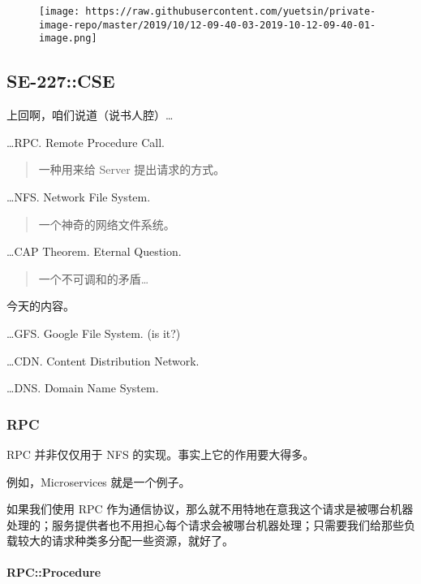 \documentclass[
]{article}
\begin{document}
\begin{figure}
\centering
\texttt{[image: https://raw.githubusercontent.com/yuetsin/private-image-repo/master/2019/10/12-09-40-03-2019-10-12-09-40-01-image.png]}
\caption{}
\end{figure}

\hypertarget{header-n125}{%
\subsection{SE-227::CSE}\label{header-n125}}

上回啊，咱们说道（说书人腔）\ldots{}

\ldots RPC. Remote Procedure Call.

\begin{quote}
一种用来给 Server 提出请求的方式。
\end{quote}

\ldots NFS. Network File System.

\begin{quote}
一个神奇的网络文件系统。
\end{quote}

\ldots CAP Theorem. Eternal Question.

\begin{quote}
一个不可调和的矛盾\ldots{}
\end{quote}

今天的内容。

\ldots GFS. Google File System. (is it?)

\ldots CDN. Content Distribution Network.

\ldots DNS. Domain Name System.

\hypertarget{header-n140}{%
\subsubsection{RPC}\label{header-n140}}

RPC 并非仅仅用于 NFS 的实现。事实上它的作用要大得多。

例如，Microservices 就是一个例子。

如果我们使用 RPC
作为通信协议，那么就不用特地在意我这个请求是被哪台机器处理的；服务提供者也不用担心每个请求会被哪台机器处理；只需要我们给那些负载较大的请求种类多分配一些资源，就好了。

\hypertarget{header-n144}{%
\paragraph{RPC::Procedure}\label{header-n144}}
\end{document}
